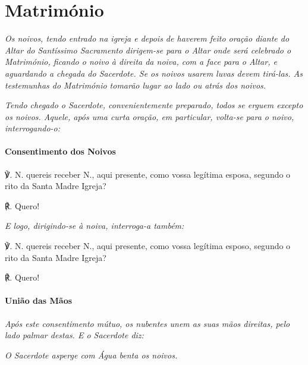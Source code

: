 \section{Matrimónio}

\textit{Os noivos, tendo entrado na igreja e depois de haverem feito oração diante do Altar do Santíssimo Sacramento dirigem-se para o Altar onde será celebrado o Matrimónio, ficando o noivo à direita da noiva, com a face para o Altar, e aguardando a chegada do Sacerdote. Se os noivos usarem luvas devem tirá-las. As testemunhas do Matrimónio tomarão lugar ao lado ou atrás dos noivos.}

\textit{Tendo chegado o Sacerdote, convenientemente preparado, todos se erguem excepto os noivos. Aquele, após uma curta oração, em particular, volta-se para o noivo, interrogando-o:}

\paragraph{Consentimento dos Noivos}

℣. {\redx N.} quereis receber {\redx N.}, aqui presente, como vossa legítima esposa, segundo o rito da Santa Madre Igreja?

℟. Quero!

\textit{E logo, dirigindo-se à noiva, interroga-a também:}

℣. {\redx N.} quereis receber {\redx N.}, aqui presente, como vossa legítima esposo, segundo o rito da Santa Madre Igreja?

℟. Quero!

\paragraph{União das Mãos}

\textit{Após este consentimento mútuo, os nubentes unem as suas mãos direitas, pelo lado palmar destas. E o Sacerdote diz:}

\begin{paracol}{2}\switchcolumn{}\switchcolumn*{}\switchcolumn{}\end{paracol}

\textit{O Sacerdote asperge com Água benta os noivos.}

